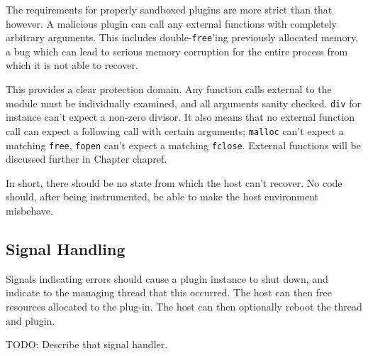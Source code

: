 The requirements for properly sandboxed plugins are more strict than that
however. A malicious plugin can call any external functions with completely
arbitrary arguments. This includes double-\texttt{free}'ing previously
allocated memory, a bug which can lead to serious memory corruption for the
entire process from which it is not able to recover.

This provides a clear protection domain. Any function calls external to the
module must be individually examined, and all arguments sanity checked.
\texttt{div} for instance can't expect a non-zero divisor. It also means that
no external function call can expect a following call with certain arguments;
\texttt{malloc} can't expect a matching \texttt{free}, \texttt{fopen} can't
expect a matching \texttt{fclose}. External functions will be discussed further
in Chapter {chapref}. 

In short, there should be no state from which the host can't recover. No code
should, after being instrumented, be able to make the host environment
misbehave.

\subsection {Signal Handling}

Signals indicating errors should cause a plugin instance to shut down, and
indicate to the managing thread that this occurred. The host can then free
resources allocated to the plug-in. The host can then optionally reboot the
thread and plugin.

TODO: Describe that signal handler.

